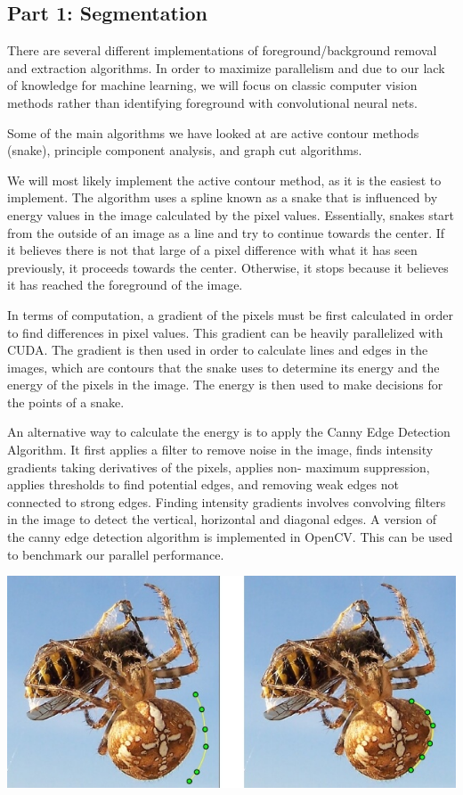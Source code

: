 \documentclass[12pt]{article}
\begin{document}
\subsection*{Part 1: Segmentation}

There are several different implementations of foreground/background removal
and extraction algorithms. In order to maximize parallelism and due to our lack
of knowledge for machine learning, we will focus on classic computer vision
methods rather than identifying foreground with convolutional neural nets.
\cite{pixel-ml}

Some of the main algorithms we have looked at are active contour methods
(snake), principle component analysis, and graph cut algorithms.

We will most likely implement the active contour method, as it is the easiest
to implement. The algorithm uses a spline known as a snake that is influenced
by energy values in the image calculated by the pixel values. Essentially,
snakes start from the outside of an image as a line and try to continue towards
the center. If it believes there is not that large of a pixel difference with
what it has seen previously, it proceeds towards the center. Otherwise, it
stops because it believes it has reached the foreground of the image.

In terms of computation, a gradient of the pixels must be first calculated in
order to find differences in pixel values. This gradient can be heavily
parallelized with CUDA. The gradient is then used in order to calculate lines
and edges in the images, which are contours that the snake uses to determine
its energy and the energy of the pixels in the image. The energy is then used
to make decisions for the points of a snake.

An alternative way to calculate the energy is to apply the Canny Edge Detection
Algorithm. \cite{canny-edge} It first applies a filter to remove noise in the
image, finds intensity gradients taking derivatives of the pixels, applies non-
maximum suppression, applies thresholds to find potential edges, and removing
weak edges not connected to strong edges. Finding intensity gradients involves
convolving filters in the image to detect the vertical, horizontal and diagonal
edges. A version of the canny edge detection algorithm is implemented in
OpenCV. \cite{canny-edge} This can be used to benchmark our parallel
performance.

\begin{center}
\includegraphics[scale=0.5]{snake-contour-example.jpg}
\cite{contour-model}
\end{center}
\end{document}
